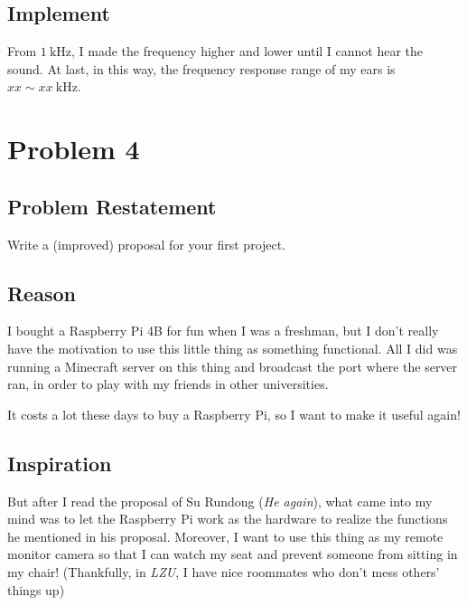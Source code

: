 \documentclass{article}
\begin{document}
\subsection{Implement}
From $1~\mathrm{kHz}$, I made the frequency higher and lower until I cannot hear the sound.
At last, in this way, the frequency response range of my ears is $xx \sim xx ~ \mathrm{kHz}$.

\section{Problem 4}
\subsection{Problem Restatement}
Write a (improved) proposal for your first project.
\subsection{Reason}
I bought a Raspberry Pi 4B for fun when I was a freshman, but I don't really have the motivation to use this little thing as something functional. All I did was running a Minecraft server on this thing and broadcast the port where the server ran, in order to play with my friends in other universities.

It costs a lot these days to buy a Raspberry Pi, so I want to make it useful again!
\subsection{Inspiration}
But after I read the proposal of Su Rundong (\emph{He again}), what came into my mind was to let the Raspberry Pi work as the hardware to realize the functions he mentioned in his proposal. Moreover, I want to use this thing as my remote monitor camera so that I can watch my seat and prevent someone from sitting in my chair! (Thankfully, in \emph{LZU}, I have nice roommates who don't mess others' things up)
\end{document}
